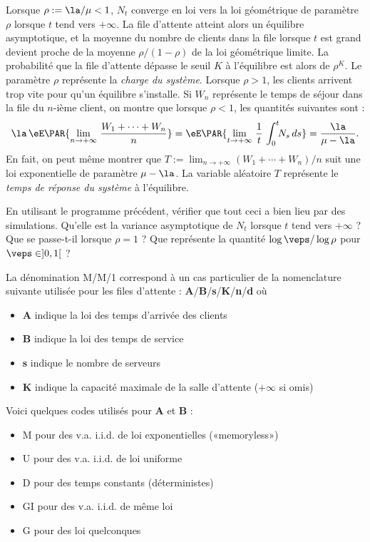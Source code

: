 Lorsque $\rho:=\la/\mu<1$, $N_t$ converge en loi vers la loi géométrique de
paramètre $\rho$ lorsque $t$ tend vers $+\infty$. La file d'attente atteint
alors un équilibre asymptotique, et la moyenne du nombre de clients dans la
file lorsque $t$ est grand devient proche de la moyenne $\rho/(1-\rho)$ de la
loi géométrique limite.  La probabilité que la file d'attente dépasse le seuil
$K$ à l'équilibre est alors de $\rho^K$. Le paramètre $\rho$ représente la
\emph{charge du système}. Lorsque $\rho>1$, les clients arrivent trop vite
pour qu'un équilibre s'installe. Si $W_n$ représente le temps de séjour dans
la file du $n$-ième client, on montre que lorsque $\rho<1$, les quantités
suivantes sont  :
$$
\la\,\eE\PAR{\lim_{n\to+\infty}\,\frac{W_1+\cdots+W_n}{n}}
=\eE\PAR{\lim_{t\to+\infty}\,\frac{1}{t}\,\int_0^t\!\!N_s\,ds}
=\frac{\la}{\mu-\la}.
$$
En fait, on peut même montrer que
$T:=\lim_{n\to+\infty}(W_1+\cdots+W_n)/n$ suit une loi exponentielle
de paramètre $\mu-\la$. La variable aléatoire $T$ représente le
\emph{temps de réponse du système} à l'équilibre.

\begin{exo}
  En utilisant le programme \ML{} précédent, vérifier que tout ceci a
  bien lieu par des simulations. Qu'elle est la variance asymptotique
  de $N_t$ lorsque $t$ tend vers $+\infty$ ?  Que se passe-t-il
  lorsque $\rho=1$ ?  Que représente la quantité $\log \veps / \log
  \rho$ pour $\veps \in]0,1[$ ?
\end{exo}

La dénomination M/M/1 correspond à un cas particulier de la
nomenclature suivante utilisée pour les files d'attente :
\textbf{A}/\textbf{B}/\textbf{s}/\textbf{K}/\textbf{n}/\textbf{d} où
\begin{itemize}
\item \textbf{A} indique la loi des temps d'arrivée des clients
\item \textbf{B} indique la loi des temps de service
\item \textbf{s} indique le nombre de serveurs
\item \textbf{K} indique la capacité maximale de la salle d'attente ($+\infty$ si
  omis)
\end{itemize}
Voici quelques codes utilisés pour \textbf{A} et \textbf{B} :
\begin{itemize}
\item M pour des v.a. i.i.d. de loi exponentielles («memoryless»)
\item U pour des v.a. i.i.d. de loi uniforme
\item D pour des temps constants (déterministes)
\item GI pour des v.a. i.i.d. de même loi
\item G pour des loi quelconques
\end{itemize}

